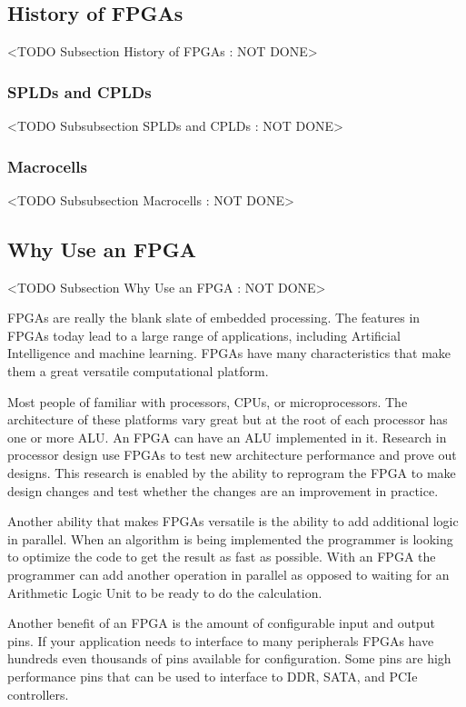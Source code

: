 \subsection{History of FPGAs}
	<TODO Subsection History of FPGAs : NOT DONE>

\subsubsection{SPLDs and CPLDs}
	<TODO Subsubsection  SPLDs and CPLDs : NOT DONE>

\subsubsection{Macrocells}
	<TODO Subsubsection  Macrocells : NOT DONE>

\subsection{Why Use an FPGA}
	<TODO Subsection Why Use an FPGA : NOT DONE>
	
FPGAs are really the blank slate of embedded processing. The features in FPGAs today lead to a large range of applications, including Artificial Intelligence and machine learning. FPGAs have many characteristics that make them a great versatile computational platform. 

Most people of familiar with processors, CPUs, or microprocessors. The architecture of these platforms vary great but at the root of each processor has one or more ALU. An FPGA can have an ALU implemented in it. Research in processor design use FPGAs to test new architecture performance and prove out designs. This research is enabled by the ability to reprogram the FPGA to make design changes and test whether the changes are an improvement in practice. 

Another ability that makes FPGAs versatile is the ability to add additional logic in parallel. When an algorithm is being implemented the programmer is looking to optimize the code to get the result as fast as possible. With an FPGA the programmer can add another operation in parallel as opposed to waiting for an Arithmetic Logic Unit to be ready to do the calculation. 

Another benefit of an FPGA is the amount of configurable input and output pins. If your application needs to interface to many peripherals FPGAs have hundreds even thousands of pins available for configuration. Some pins are high performance pins that can be used to interface to DDR, SATA, and PCIe controllers. 

